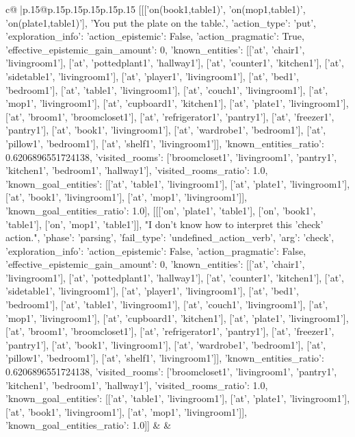 \documentclass{article}
\begin{document}
{\begin{supertabular}{c@{$\;$}|p{.15\linewidth}@{}p{.15\linewidth}p{.15\linewidth}p{.15\linewidth}p{.15\linewidth}p{.15\linewidth}}
{{{	 [[['on(book1,table1)', 'on(mop1,table1)', 'on(plate1,table1)'], 'You put the plate on the table.', {'action_type': 'put', 'exploration_info': {'action_epistemic': False, 'action_pragmatic': True, 'effective_epistemic_gain_amount': 0, 'known_entities': [['at', 'chair1', 'livingroom1'], ['at', 'pottedplant1', 'hallway1'], ['at', 'counter1', 'kitchen1'], ['at', 'sidetable1', 'livingroom1'], ['at', 'player1', 'livingroom1'], ['at', 'bed1', 'bedroom1'], ['at', 'table1', 'livingroom1'], ['at', 'couch1', 'livingroom1'], ['at', 'mop1', 'livingroom1'], ['at', 'cupboard1', 'kitchen1'], ['at', 'plate1', 'livingroom1'], ['at', 'broom1', 'broomcloset1'], ['at', 'refrigerator1', 'pantry1'], ['at', 'freezer1', 'pantry1'], ['at', 'book1', 'livingroom1'], ['at', 'wardrobe1', 'bedroom1'], ['at', 'pillow1', 'bedroom1'], ['at', 'shelf1', 'livingroom1']], 'known_entities_ratio': 0.6206896551724138, 'visited_rooms': ['broomcloset1', 'livingroom1', 'pantry1', 'kitchen1', 'bedroom1', 'hallway1'], 'visited_rooms_ratio': 1.0, 'known_goal_entities': [['at', 'table1', 'livingroom1'], ['at', 'plate1', 'livingroom1'], ['at', 'book1', 'livingroom1'], ['at', 'mop1', 'livingroom1']], 'known_goal_entities_ratio': 1.0}}], [[['on', 'plate1', 'table1'], ['on', 'book1', 'table1'], ['on', 'mop1', 'table1']], "I don't know how to interpret this 'check' action.", {'phase': 'parsing', 'fail_type': 'undefined_action_verb', 'arg': 'check', 'exploration_info': {'action_epistemic': False, 'action_pragmatic': False, 'effective_epistemic_gain_amount': 0, 'known_entities': [['at', 'chair1', 'livingroom1'], ['at', 'pottedplant1', 'hallway1'], ['at', 'counter1', 'kitchen1'], ['at', 'sidetable1', 'livingroom1'], ['at', 'player1', 'livingroom1'], ['at', 'bed1', 'bedroom1'], ['at', 'table1', 'livingroom1'], ['at', 'couch1', 'livingroom1'], ['at', 'mop1', 'livingroom1'], ['at', 'cupboard1', 'kitchen1'], ['at', 'plate1', 'livingroom1'], ['at', 'broom1', 'broomcloset1'], ['at', 'refrigerator1', 'pantry1'], ['at', 'freezer1', 'pantry1'], ['at', 'book1', 'livingroom1'], ['at', 'wardrobe1', 'bedroom1'], ['at', 'pillow1', 'bedroom1'], ['at', 'shelf1', 'livingroom1']], 'known_entities_ratio': 0.6206896551724138, 'visited_rooms': ['broomcloset1', 'livingroom1', 'pantry1', 'kitchen1', 'bedroom1', 'hallway1'], 'visited_rooms_ratio': 1.0, 'known_goal_entities': [['at', 'table1', 'livingroom1'], ['at', 'plate1', 'livingroom1'], ['at', 'book1', 'livingroom1'], ['at', 'mop1', 'livingroom1']], 'known_goal_entities_ratio': 1.0}}]] 
	  } 
	   } 
	   } 
	 & & \\ 
 


\end{supertabular}}
\end{document}
